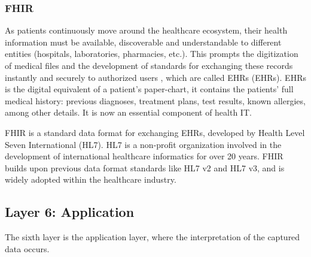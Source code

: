 \subsubsection{\acf{FHIR}}

As patients continuously move around the healthcare ecosystem, their health information must be available, discoverable and understandable to different entities (hospitals, laboratories, pharmacies, etc.). This prompts the digitization of medical files and the development of standards for exchanging these records instantly and securely to authorized users \cite{HL72019}, which are called \acl{EHR}s (\acs{EHR}s). \acs{EHR}s is the digital equivalent of a patient's paper-chart, it contains the patients' full medical history: previous diagnoses, treatment plans, test results, known allergies, among other details. It is now an essential component of health IT. 


\acf{FHIR} is a standard data format for exchanging \acs{EHR}s, developed by Health Level Seven International (HL7). HL7 is a non-profit organization involved in the development of international healthcare informatics for over 20 years. \acs{FHIR} builds upon previous data format standards like HL7 v2 and HL7 v3, and is widely adopted within the healthcare industry. 

\subsection{Layer 6: Application}
\label{sec:iot-model-layer6}



The sixth layer is the application layer, where the interpretation of the captured data occurs. 



